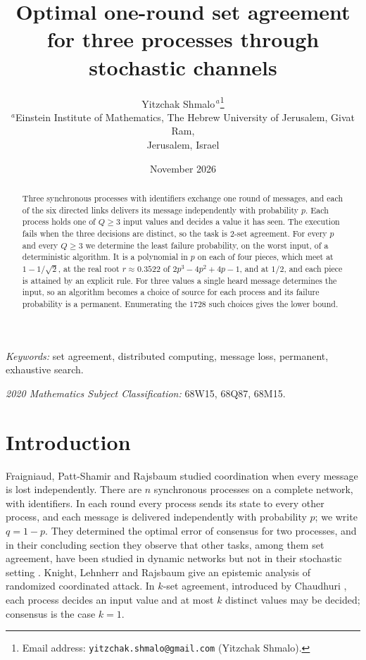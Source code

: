 \documentclass[11pt]{article}
\title{Optimal one-round set agreement for three processes through stochastic channels}
\author{Yitzchak Shmalo$^{\,a}$\thanks{Email address:
\texttt{yitzchak.shmalo@gmail.com} (Yitzchak Shmalo).}\\
{\small $^{a}$Einstein Institute of Mathematics, The Hebrew University of
Jerusalem, Givat Ram,}\\
{\small Jerusalem, Israel}}
\date{November 2026}
\theoremstyle{remark}
\begin{document}
\maketitle

\begin{abstract}
Three synchronous processes with identifiers exchange one round of messages, and each of the six directed links delivers its message independently with probability $p$. Each process holds one of $Q\ge3$ input values and decides a value it has seen. The execution fails when the three decisions are distinct, so the task is $2$-set agreement. For every $p$ and every $Q\ge3$ we determine the least failure probability, on the worst input, of a deterministic algorithm. It is a polynomial in $p$ on each of four pieces, which meet at $1-1/\sqrt2$, at the real root $r\approx0.3522$ of $2p^3-4p^2+4p-1$, and at $1/2$, and each piece is attained by an explicit rule. For three values a single heard message determines the input, so an algorithm becomes a choice of source for each process and its failure probability is a permanent. Enumerating the $1728$ such choices gives the lower bound.
\end{abstract}

\noindent\textit{Keywords:} set agreement, distributed computing, message loss, permanent, exhaustive search.

\noindent\textit{2020 Mathematics Subject Classification:} 68W15, 68Q87, 68M15.

\section{Introduction}\label{sec:intro}

Fraigniaud, Patt-Shamir and Rajsbaum \cite{FPR} studied coordination when every message is lost independently. There are $n$ synchronous processes on a complete network, with identifiers. In each round every process sends its state to every other process, and each message is delivered independently with probability $p$; we write $q=1-p$. They determined the optimal error of consensus for two processes, and in their concluding section they observe that other tasks, among them set agreement, have been studied in dynamic networks \cite{Biely,FNP} but not in their stochastic setting \cite{FPR}. Knight, Lehnherr and Rajsbaum \cite{KLR} give an epistemic analysis of randomized coordinated attack. In $k$-set agreement, introduced by Chaudhuri \cite{Chaudhuri}, each process decides an input value and at most $k$ distinct values may be decided; consensus is the case $k=1$.
\end{document}
